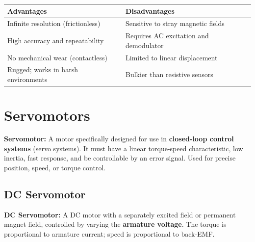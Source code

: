 \documentclass[12pt,a4paper]{article}
\begin{document}
\begin{tabularx}{\linewidth}{|>{\centering\arraybackslash}X|>{\centering\arraybackslash}X|}
\hline
\textbf{\color{mygreen}Advantages} & \textbf{\color{myred}Disadvantages} \\
\hline
Infinite resolution (frictionless) & Sensitive to stray magnetic fields \\
\hline
High accuracy and repeatability & Requires AC excitation and demodulator \\
\hline
No mechanical wear (contactless) & Limited to linear displacement \\
\hline
Rugged; works in harsh environments & Bulkier than resistive sensors \\
\hline
\end{tabularx}

\section{Servomotors}

\begin{tcolorbox}[defbox]
\textbf{Servomotor:} A motor specifically designed for use in \textbf{closed-loop control systems} (servo systems). It must have a linear torque-speed characteristic, low inertia, fast response, and be controllable by an error signal. Used for precise position, speed, or torque control.
\end{tcolorbox}

\subsection{DC Servomotor}

\begin{tcolorbox}[defbox]
\textbf{DC Servomotor:} A DC motor with a separately excited field or permanent magnet field, controlled by varying the \textbf{armature voltage}. The torque is proportional to armature current; speed is proportional to back-EMF.
\end{tcolorbox}
\end{document}
